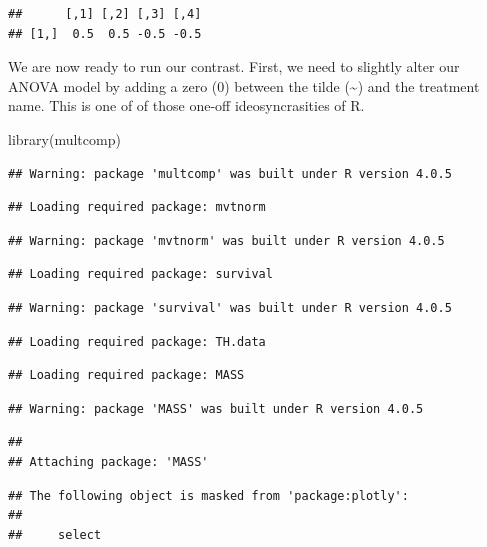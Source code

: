 \documentclass[
]{book}
\newenvironment{Shaded}{\begin{snugshade}}{\end{snugshade}}
\newcommand{\FunctionTok}[1]{\textcolor[rgb]{0.00,0.00,0.00}{#1}}
\newcommand{\NormalTok}[1]{#1}
\begin{document}
\begin{verbatim}
##      [,1] [,2] [,3] [,4]
## [1,]  0.5  0.5 -0.5 -0.5
\end{verbatim}

We are now ready to run our contrast. First, we need to slightly alter our ANOVA model by adding a zero (0) between the tilde (\textasciitilde) and the treatment name. This is one of of those one-off ideosyncrasities of R.

\begin{Shaded}
\begin{Highlighting}[]
\FunctionTok{library}\NormalTok{(multcomp)}
\end{Highlighting}
\end{Shaded}

\begin{verbatim}
## Warning: package 'multcomp' was built under R version 4.0.5
\end{verbatim}

\begin{verbatim}
## Loading required package: mvtnorm
\end{verbatim}

\begin{verbatim}
## Warning: package 'mvtnorm' was built under R version 4.0.5
\end{verbatim}

\begin{verbatim}
## Loading required package: survival
\end{verbatim}

\begin{verbatim}
## Warning: package 'survival' was built under R version 4.0.5
\end{verbatim}

\begin{verbatim}
## Loading required package: TH.data
\end{verbatim}

\begin{verbatim}
## Loading required package: MASS
\end{verbatim}

\begin{verbatim}
## Warning: package 'MASS' was built under R version 4.0.5
\end{verbatim}

\begin{verbatim}
## 
## Attaching package: 'MASS'
\end{verbatim}

\begin{verbatim}
## The following object is masked from 'package:plotly':
## 
##     select
\end{verbatim}
\end{document}
